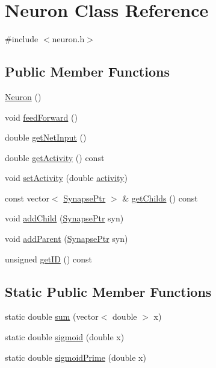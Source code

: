 \hypertarget{class_neuron}{}\section{Neuron Class Reference}
\label{class_neuron}


{\ttfamily \#include $<$neuron.\+h$>$}

\subsection*{Public Member Functions}
\begin{DoxyCompactItemize}
\item 
\hyperlink{class_neuron_a823487d01615fadb8ac19a2768dd9d96}{Neuron} ()
\item 
void \hyperlink{class_neuron_a65a5533d21bd589a51a9ad502dfcb331}{feed\+Forward} ()
\item 
double \hyperlink{class_neuron_a5a84194bf3f93051d3d9f02e9146f1d4}{get\+Net\+Input} ()
\item 
double \hyperlink{class_neuron_a09bc798d5f673efd080092001ac3916c}{get\+Activity} () const
\item 
void \hyperlink{class_neuron_a53bda59e2ab1f8342a1af503a1652cdd}{set\+Activity} (double \hyperlink{class_neuron_a4f763f92e820b748629781dc8791ab9d}{activity})
\item 
const vector$<$ \hyperlink{neural_network_8h_ac587b5c69519c070958c5cb318ddc50f}{Synapse\+Ptr} $>$ \& \hyperlink{class_neuron_a976fbbfd4fa7332a412901f8f9956967}{get\+Childs} () const
\item 
void \hyperlink{class_neuron_a2960eb3ff73bd14d345f2204b2b887a4}{add\+Child} (\hyperlink{neural_network_8h_ac587b5c69519c070958c5cb318ddc50f}{Synapse\+Ptr} syn)
\item 
void \hyperlink{class_neuron_aee0e35aff21d424300a314fb0695da2e}{add\+Parent} (\hyperlink{neural_network_8h_ac587b5c69519c070958c5cb318ddc50f}{Synapse\+Ptr} syn)
\item 
unsigned \hyperlink{class_neuron_a4844d18cf096e70569b21f0e45670520}{get\+ID} () const
\end{DoxyCompactItemize}
\subsection*{Static Public Member Functions}
\begin{DoxyCompactItemize}
\item 
static double \hyperlink{class_neuron_ab151ba9bdd3e9f2aff01e782b41f92e7}{sum} (vector$<$ double $>$ x)
\item 
static double \hyperlink{class_neuron_a24893b0c92f073daae4c697b35e395f5}{sigmoid} (double x)
\item 
static double \hyperlink{class_neuron_ad2814c90d74e4400c16a116b023447fa}{sigmoid\+Prime} (double x)
\end{DoxyCompactItemize}
